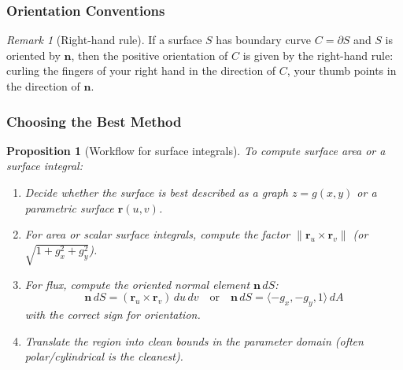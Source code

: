 \documentclass[12pt]{article}
\numberwithin{equation}{section}
\newcommand{\vect}[1]{\boldsymbol{#1}}   %
\theoremstyle{plain}
\newtheorem{proposition}[theorem]{Proposition}
\theoremstyle{definition}
\theoremstyle{remark}
\newtheorem{remark}[theorem]{Remark}
\begin{document}
\subsubsection{Orientation Conventions}

\begin{remark}[Right-hand rule]
If a surface $S$ has boundary curve $C=\partial S$ and $S$ is oriented by $\vect n$, then the positive orientation of $C$ is given by the right-hand rule: curling the fingers of your right hand in the direction of $C$, your thumb points in the direction of $\vect n$.
\end{remark}

\subsubsection{Choosing the Best Method}

\begin{proposition}[Workflow for surface integrals]\label{prop:surface-workflow}
To compute surface area or a surface integral:
\begin{enumerate}[label=(\arabic*)]
\item Decide whether the surface is best described as a \emph{graph} $z=g(x,y)$ or a \emph{parametric surface} $\vect r(u,v)$.
\item For area or scalar surface integrals, compute the factor $\|\vect r_u\times\vect r_v\|$ (or $\sqrt{1+g_x^2+g_y^2}$).
\item For flux, compute the oriented normal element $\vect n\,dS$:
\[
\vect n\,dS = (\vect r_u\times \vect r_v)\,du\,dv
\quad\text{or}\quad
\vect n\,dS=\langle -g_x,-g_y,1\rangle\,dA
\]
with the correct sign for orientation.
\item Translate the region into clean bounds in the parameter domain (often polar/cylindrical is the cleanest).
\end{enumerate}
\end{proposition}
\end{document}
